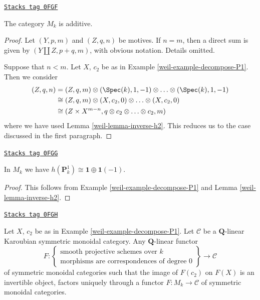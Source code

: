 \begin{lemma}[Additive]
\label{weil-lemma-additive}
\href{https://stacks.math.columbia.edu/tag/0FGF}{\texttt{Stacks tag 0FGF}}

The category $M_k$ is additive.
\end{lemma}

\begin{proof}

Let $(Y, p, m)$ and $(Z, q, n)$ be motives. If $n = m$, then a
direct sum is given by $(Y \amalg Z, p + q, m)$, with obvious notation.
Details omitted.

\medskip\noindent
Suppose that $n < m$. Let $X$, $c_2$ be as in
Example \ref{weil-example-decompose-P1}. Then we consider
\begin{align*}
(Z, q, n)
& =
(Z, q, m) \otimes (\Spec(k), 1, -1) \otimes \ldots \otimes
(\Spec(k), 1, -1) \\
& \cong
(Z, q, m) \otimes (X, c_2, 0) \otimes \ldots \otimes (X, c_2, 0) \\
& \cong
(Z \times X^{m - n}, q \otimes c_2 \otimes \ldots \otimes c_2, m)
\end{align*}
where we have used Lemma \ref{weil-lemma-inverse-h2}.
This reduces us to the case discussed in the first paragraph.
\end{proof}

\begin{lemma}[Decompose P1]
\label{weil-lemma-decompose-P1}
\href{https://stacks.math.columbia.edu/tag/0FGG}{\texttt{Stacks tag 0FGG}}

In $M_k$ we have $h(\mathbf{P}^1_k) \cong \mathbf{1} \oplus \mathbf{1}(-1)$.
\end{lemma}

\begin{proof}

This follows from Example \ref{weil-example-decompose-P1} and
Lemma \ref{weil-lemma-inverse-h2}.
\end{proof}

\begin{lemma}
\label{weil-lemma-characterize-motives}
\href{https://stacks.math.columbia.edu/tag/0FGH}{\texttt{Stacks tag 0FGH}}

Let $X$, $c_2$ be as in Example \ref{weil-example-decompose-P1}.
Let $\mathcal{C}$ be a $\mathbf{Q}$-linear Karoubian symmetric
monoidal category. Any $\mathbf{Q}$-linear functor
$$
F :
\left\{
\begin{matrix}
\text{smooth projective schemes over }k\\
\text{morphisms are correspondences of degree }0
\end{matrix}
\right\}
\longrightarrow
\mathcal{C}
$$
of symmetric monoidal categories such that the image of $F(c_2)$ on
$F(X)$ is an invertible object, factors uniquely through a functor
$F : M_k \to \mathcal{C}$ of symmetric monoidal categories.
\end{lemma}

